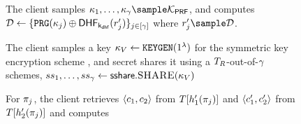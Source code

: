 \begin{figure}[th!]
\begin{mdframed}
\item\label{fuzzy:pre:prg} The client samples $\genericSymmKey_1, \dots, \genericSymmKey_\numProjections \sample \prfKeySpace$, and computes $\dhfSet \assign \{\prg(\genericSymmKey_\projIdx) \oplus \dhf[\dhfKey](\genericRandAlt[\projIdx])\}_{\projIdx \in \nats[\numProjections]}$ where $\genericRandAlt[\projIdx] \sample \dhfDomain$.

\item The client samples a key $\voucherKey \assign \encryptKeyGen(1^\secParam)$ for the symmetric key encryption scheme \encryptionSchemeDefn, and secret shares it using a 
$T_{R}$-out-of-$\gamma$ schemes, 
$ss_{1}, \dots, ss_{\gamma} \gets \mathsf{sshare}.\textsc{SHARE}(\kappa_{V})$


\item\label{fuzzy:pre:match_cht} For $\projFn[\projIdx]$, the client retrieves $\langle \ciphertext[1], \ciphertext[2] \rangle$ from $\cuckooTable[\cuckooHashFn{1}(\projFn[\projIdx])]$ and 
$\langle \ciphertext[1]', \ciphertext[2]' \rangle$ from $\cuckooTable[\cuckooHashFn{2}(\projFn[\projIdx])]$ and computes

\enumListStartResume


\end{mdframed}
\end{figure}
